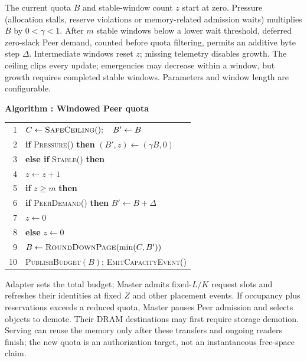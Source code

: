 The current quota $B$ and stable-window count $z$ start at zero.
Pressure (allocation stalls, reserve violations or
memory-related admission waits) multiplies $B$ by $0<\gamma<1$. After $m$
stable windows below a lower wait threshold, deferred zero-slack Peer
demand, counted before quota filtering, permits an additive byte step
$\Delta$. Intermediate windows reset
$z$; missing telemetry disables growth. The ceiling clips every update;
emergencies may decrease within a window, but growth requires completed
stable windows. Parameters and window length are configurable.

\par\medskip\noindent\begin{minipage}{\columnwidth}
\raggedright
 \label{alg:adapter}
 \textbf{Algorithm \thedesignalgorithm: Windowed Peer quota}
 \par\smallskip
 \begin{tabularx}{\columnwidth}{@{}r@{\quad}X@{}}
 \toprule
 1 & $C\gets\textsc{SafeCeiling}();\quad B'\gets B$ \\
 2 & \textbf{if} \textsc{Pressure}() \textbf{then} $(B',z)\gets(\gamma B,0)$ \\
 3 & \textbf{else if} \textsc{Stable}() \textbf{then} \\
 4 & \quad $z\gets z+1$ \\
 5 & \quad \textbf{if} $z\ge m$ \textbf{then} \\
 6 & \qquad \textbf{if} \textsc{PeerDemand}() \textbf{then} $B'\gets B+\Delta$ \\
 7 & \qquad $z\gets0$ \\
 8 & \textbf{else} $z\gets0$ \\
 9 & $B\gets\textsc{RoundDownPage}(\min(C,B'))$ \\
 10 & \textsc{PublishBudget}$(B)$; \textsc{EmitCapacityEvent}() \\
 \bottomrule
 \end{tabularx}
\end{minipage}\par\medskip

Adapter sets the total budget; Master admits fixed-$L/K$ request slots
and refreshes their identities at fixed $Z$ and other placement events. If occupancy plus reservations exceeds a reduced
quota, Master pauses Peer admission and selects objects to demote. Their
DRAM destinations may first require storage demotion. Serving can reuse
the memory only after these transfers and ongoing readers finish; the
new quota is an authorization target, not an instantaneous free-space claim.
